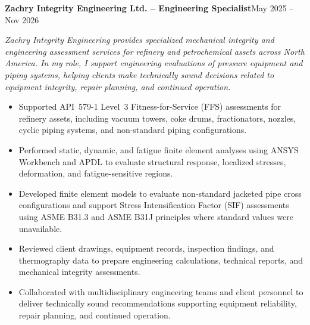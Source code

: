\documentclass[10pt, letterpaper]{article}
\newcommand{\jobheader}[3]{\vspace{5pt}\textbf{#1 {--} #2}\hfill{\small\color{black}#3}\par\vspace{1pt}}
\newcommand{\jobcontext}[1]{{\small\textit{#1}}\vspace{3pt}\par}
\begin{document}
\jobheader{Zachry Integrity Engineering Ltd.}{Engineering Specialist}{May 2025 -- Nov 2026}
\jobcontext{Zachry Integrity Engineering provides specialized mechanical integrity and engineering assessment services for refinery and petrochemical assets across North America. In my role, I support engineering evaluations of pressure equipment and piping systems, helping clients make technically sound decisions related to equipment integrity, repair planning, and continued operation.}
\begin{itemize}
  \item Supported API~579-1 Level~3 Fitness-for-Service (FFS) assessments for refinery assets, including vacuum towers, coke drums, fractionators, nozzles, cyclic piping systems, and non-standard piping configurations.
  \item Performed static, dynamic, and fatigue finite element analyses using ANSYS Workbench and APDL to evaluate structural response, localized stresses, deformation, and fatigue-sensitive regions.
  \item Developed finite element models to evaluate non-standard jacketed pipe cross configurations and support Stress Intensification Factor (SIF) assessments using ASME B31.3 and ASME B31J principles where standard values were unavailable.
  \item Reviewed client drawings, equipment records, inspection findings, and thermography data to prepare engineering calculations, technical reports, and mechanical integrity assessments.
  \item Collaborated with multidisciplinary engineering teams and client personnel to deliver technically sound recommendations supporting equipment reliability, repair planning, and continued operation.
\end{itemize}

\vspace{3pt}
\end{document}
